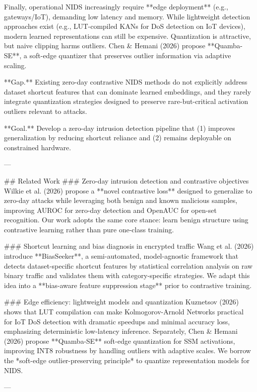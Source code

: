 Finally, operational NIDS increasingly require **edge deployment** (e.g., gateways/IoT), demanding low latency and memory. While lightweight detection approaches exist (e.g., LUT-compiled KANs for DoS detection on IoT devices), modern learned representations can still be expensive. Quantization is attractive, but naive clipping harms outliers. Chen & Hemani (2026) propose **Quamba-SE**, a soft-edge quantizer that preserves outlier information via adaptive scaling.

**Gap.** Existing zero-day contrastive NIDS methods do not explicitly address dataset shortcut features that can dominate learned embeddings, and they rarely integrate quantization strategies designed to preserve rare-but-critical activation outliers relevant to attacks.

**Goal.** Develop a zero-day intrusion detection pipeline that (1) improves generalization by reducing shortcut reliance and (2) remains deployable on constrained hardware.

---

## Related Work
### Zero-day intrusion detection and contrastive objectives
Wilkie et al. (2026) propose a **novel contrastive loss** designed to generalize to zero-day attacks while leveraging both benign and known malicious samples, improving AUROC for zero-day detection and OpenAUC for open-set recognition. Our work adopts the same core stance: learn benign structure using contrastive learning rather than pure one-class training.

### Shortcut learning and bias diagnosis in encrypted traffic
Wang et al. (2026) introduce **BiasSeeker**, a semi-automated, model-agnostic framework that detects dataset-specific shortcut features by statistical correlation analysis on raw binary traffic and validates them with category-specific strategies. We adapt this idea into a **bias-aware feature suppression stage** prior to contrastive training.

### Edge efficiency: lightweight models and quantization
Kuznetsov (2026) shows that LUT compilation can make Kolmogorov-Arnold Networks practical for IoT DoS detection with dramatic speedups and minimal accuracy loss, emphasizing deterministic low-latency inference. Separately, Chen & Hemani (2026) propose **Quamba-SE** soft-edge quantization for SSM activations, improving INT8 robustness by handling outliers with adaptive scales. We borrow the *soft-edge outlier-preserving principle* to quantize representation models for NIDS.

---

